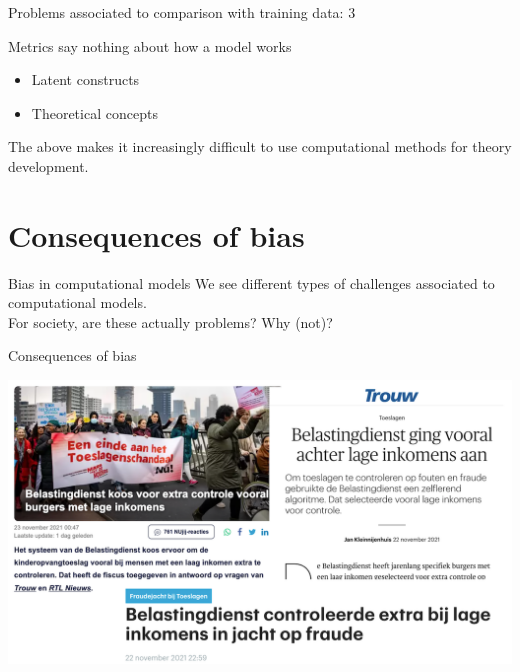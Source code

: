 \documentclass[compress]{beamer}
\begin{document}


\begin{frame}[fragile]{Problems associated to comparison with training data: 3} 	
	\begin{alertblock}{Metrics say nothing about how a model works}
		\begin{itemize}
			\item Latent constructs
			\item Theoretical concepts
		\end{itemize}
	\end{alertblock}
The above makes it increasingly difficult to use computational methods for theory development.
\end{frame}


\section{Consequences of bias}

\begin{frame}[fragile]{Bias in computational models}	
We see different types of challenges associated to computational models. \\
For society, are these actually problems? Why (not)?
\end{frame}

\begin{frame}[fragile]{Consequences of bias} 	
\begin{center}
	\includegraphics[width=\linewidth,height=\textheight,keepaspectratio]{../pictures/toeslagenaffaire_headlines.png} 
\end{center}
\end{frame}
\end{document}
